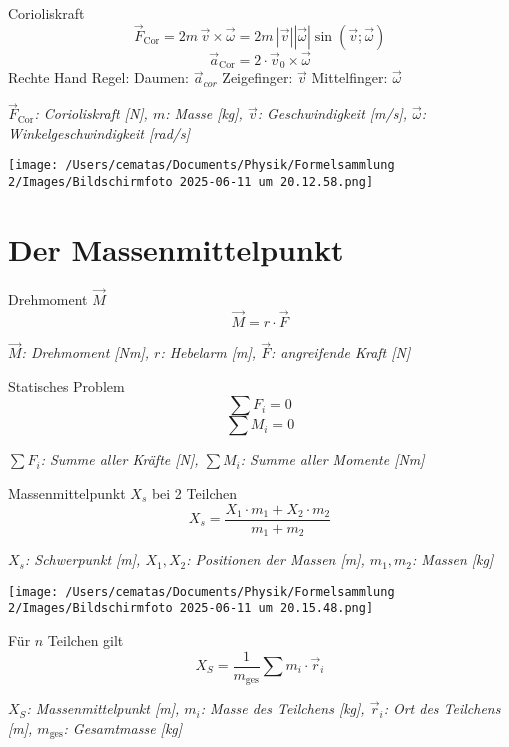 \documentclass[a4paper,10pt]{article}
\newenvironment{displayformula}
{
	\begin{framed}
		\color{formulaColor}
	}
	{\end{framed}}
\newcommand{\formulalegend}[1]{%
	\par\vspace{0.5ex}%
	{{\color{legendColor}\RaggedRight\small\textit{#1}}}%
	\par\vspace{1.5ex}%
}
\begin{document}
\begin{displayformula}
	Corioliskraft
	\[
	\vec{F}_{\mathrm{Cor}} = 2m\, \vec{v} \times \vec{\omega} = 2m\, | \vec{v} | | \vec{\omega} | \sin(\vec{v}; \vec{\omega})
	\]
	\[
	\vec{a}_{\mathrm{Cor}} = 2 \cdot \vec{v}_0 \times \vec{\omega}
	\]
	Rechte Hand Regel: Daumen: $\vec{a}_{cor}$ Zeigefinger: $\vec{v}$ Mittelfinger: $\vec{\omega}$
\end{displayformula}
\formulalegend{
	\( \vec{F}_{\mathrm{Cor}} \): Corioliskraft [N], \( m \): Masse [kg], \( \vec{v} \): Geschwindigkeit [m/s], \( \vec{\omega} \):  Winkelgeschwindigkeit [rad/s]
}

\texttt{[image: /Users/cematas/Documents/Physik/Formelsammlung 2/Images/Bildschirmfoto 2025-06-11 um 20.12.58.png]}


\section{Der Massenmittelpunkt}

\begin{displayformula}
	Drehmoment \( \vec{M} \)
	\[
	\vec{M} = r \cdot \vec{F}
	\]
\end{displayformula}
\formulalegend{
	\( \vec{M} \): Drehmoment [Nm], \( r \): Hebelarm [m], \( \vec{F} \): angreifende Kraft [N]
}

\begin{displayformula}
	Statisches Problem
	\[
	\sum F_i = 0
	\]
	\[
	\sum M_i = 0
	\]
\end{displayformula}
\formulalegend{
	\( \sum F_i \): Summe aller Kräfte [N], \( \sum M_i \): Summe aller Momente [Nm]
}

\begin{displayformula}
	Massenmittelpunkt \( X_s \) bei 2 Teilchen
	\[
	X_s = \frac{X_1 \cdot m_1 + X_2 \cdot m_2}{m_1 + m_2}
	\]
\end{displayformula}
\formulalegend{
	\( X_s \): Schwerpunkt [m], \( X_1, X_2 \): Positionen der Massen [m], \( m_1, m_2 \): Massen [kg]
}

\texttt{[image: /Users/cematas/Documents/Physik/Formelsammlung 2/Images/Bildschirmfoto 2025-06-11 um 20.15.48.png]}
\begin{displayformula}
	Für \( n \) Teilchen gilt
	\[
	X_S = \frac{1}{m_{\text{ges}}} \sum m_i \cdot \vec{r}_i
	\]
\end{displayformula}
\formulalegend{
	\( X_S \): Massenmittelpunkt [m], \( m_i \): Masse des Teilchens [kg], \( \vec{r}_i \): Ort des Teilchens [m], \( m_{\text{ges}} \): Gesamtmasse [kg]
}
\end{document}

